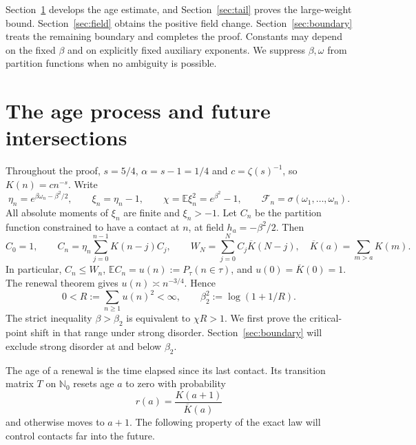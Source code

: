 \documentclass[11pt]{article}
\theoremstyle{remark}
\numberwithin{equation}{section}
\newcommand{\N}{\mathbb N}
\newcommand{\E}{\mathbb E}
\begin{document}
Section~\ref{sec:age} develops the age estimate, and
Section~\ref{sec:tail} proves the large-weight bound.
Section~\ref{sec:field} obtains the positive field change.
Section~\ref{sec:boundary} treats the remaining boundary and completes the
proof. Constants may depend on the fixed $\beta$ and on explicitly fixed
auxiliary exponents. We suppress $\beta,\omega$ from partition functions
when no ambiguity is possible.

\section{The age process and future intersections}\label{sec:age}

Throughout the proof, $s=5/4$, $\alpha=s-1=1/4$ and
$c=\zeta(s)^{-1}$, so $K(n)=cn^{-s}$. Write
\[
 \eta_n=e^{\beta\omega_n-\beta^2/2},\qquad
 \xi_n=\eta_n-1,\qquad \chi=\E\xi_n^2=e^{\beta^2}-1,
 \qquad \mathcal F_n=\sigma(\omega_1,\ldots,\omega_n).
\]
All absolute moments of $\xi_n$ are finite and $\xi_n>-1$.
Let $C_n$ be the partition function constrained to have a contact at $n$,
at field $h_a=-\beta^2/2$. Then
\begin{equation}\label{eq:renewal-recursion}
 C_0=1,\qquad C_n=\eta_n\sum_{j=0}^{n-1}K(n-j)C_j,
 \qquad W_N=\sum_{j=0}^N C_j\overline K(N-j),
 \quad \overline K(a)=\sum_{m>a}K(m).
\end{equation}
In particular, $C_n\le W_n$, $\E C_n=u(n):=P_\tau(n\in\tau)$,
and $u(0)=\overline K(0)=1$. The renewal theorem
\cite[Theorem~3.16]{Berger} gives $u(n)\asymp n^{-3/4}$. Hence
\begin{equation}\label{eq:R}
 0<R:=\sum_{n\ge1}u(n)^2<\infty,\qquad
 \beta_2^2:=\log(1+1/R).
\end{equation}
The strict inequality $\beta>\beta_2$ is equivalent to $\chi R>1$.
We first prove the critical-point shift in that range under strong disorder.
Section~\ref{sec:boundary} will exclude strong disorder at and below $\beta_2$.

The age of a renewal is the time elapsed since its last contact. Its
transition matrix $T$ on $\N_0$ resets age $a$ to zero with probability
\[
 r(a)=\frac{K(a+1)}{\overline K(a)}
\]
and otherwise moves to $a+1$. The following property of the exact law will
control contacts far into the future.
\end{document}
